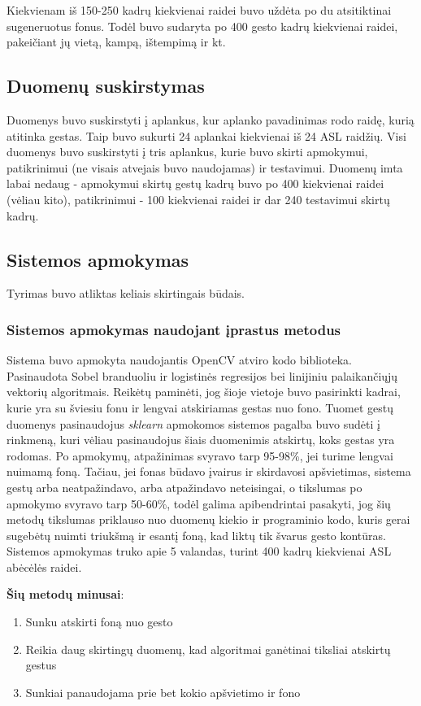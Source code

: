 \documentclass{VUMIFInfKursinis}
\begin{document}
Kiekvienam iš 150-250 kadrų kiekvienai raidei buvo uždėta po du atsitiktinai sugeneruotus fonus. Todėl buvo sudaryta po 400 gesto kadrų kiekvienai raidei, pakeičiant jų vietą, kampą, ištempimą ir kt.

\subsection{Duomenų suskirstymas}

Duomenys buvo suskirstyti į aplankus, kur aplanko pavadinimas rodo raidę, kurią atitinka gestas. Taip buvo sukurti 24 aplankai kiekvienai iš 24 ASL raidžių. Visi duomenys buvo suskirstyti į tris aplankus, kurie buvo skirti apmokymui, patikrinimui (ne visais atvejais buvo naudojamas) ir testavimui. Duomenų imta labai nedaug - apmokymui skirtų gestų kadrų buvo po 400 kiekvienai raidei (vėliau kito), patikrinimui - 100 kiekvienai raidei ir dar 240 testavimui skirtų kadrų.

\subsection{Sistemos apmokymas}
Tyrimas buvo atliktas keliais skirtingais būdais.

\subsubsection{Sistemos apmokymas naudojant įprastus metodus}
Sistema buvo apmokyta naudojantis OpenCV atviro kodo biblioteka. Pasinaudota Sobel branduoliu ir logistinės regresijos bei linijiniu palaikančiųjų vektorių algoritmais. Reikėtų paminėti, jog šioje vietoje buvo pasirinkti kadrai, kurie yra su šviesiu fonu ir lengvai atskiriamas gestas nuo fono. Tuomet gestų duomenys pasinaudojus \textit{sklearn} apmokomos sistemos pagalba buvo sudėti į rinkmeną, kuri vėliau pasinaudojus šiais duomenimis atskirtų, koks gestas yra rodomas. Po apmokymų, atpažinimas svyravo tarp 95-98\%, jei turime lengvai nuimamą foną. Tačiau, jei fonas būdavo įvairus ir skirdavosi apšvietimas, sistema gestų arba neatpažindavo, arba atpažindavo neteisingai, o tikslumas po apmokymo svyravo tarp 50-60\%, todėl galima apibendrintai pasakyti, jog šių metodų tikslumas priklauso nuo duomenų kiekio ir programinio kodo, kuris gerai sugebėtų nuimti triukšmą ir esantį foną, kad liktų tik švarus gesto kontūras. Sistemos apmokymas truko apie 5 valandas, turint 400 kadrų kiekvienai ASL abėcėlės raidei.

\textbf{Šių metodų minusai}:
\begin{enumerate}
	\item Sunku atskirti foną nuo gesto
	\item Reikia daug skirtingų duomenų, kad algoritmai ganėtinai tiksliai atskirtų gestus
	\item Sunkiai panaudojama prie bet kokio apšvietimo ir fono
\end{enumerate}
\end{document}
